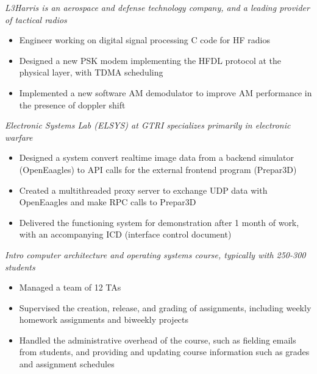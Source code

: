 
\begin{samepage}
\newline
\textit{L3Harris is an aerospace and defense technology company, and a leading provider of tactical radios}
\begin{itemize}[noitemsep,topsep=0pt,parsep=0pt,partopsep=0pt]
    \item Engineer working on digital signal processing C code for HF radios
    \item Designed a new PSK modem implementing the HFDL protocol at the physical layer, with TDMA scheduling
    \item Implemented a new software AM demodulator to improve AM performance in the presence of doppler shift
\end{itemize}
\end{samepage}
\smallskip

\begin{samepage}
\newline
\textit{Electronic Systems Lab (ELSYS) at GTRI specializes primarily in electronic warfare}
\begin{itemize}[noitemsep,topsep=0pt,parsep=0pt,partopsep=0pt]
    \item Designed a system convert realtime image data from a backend simulator (OpenEaagles) to API calls for the external frontend program (Prepar3D)
    \item Created a multithreaded proxy server to exchange UDP data with OpenEaagles and make RPC calls to Prepar3D
    \item Delivered the functioning system for demonstration after 1 month of work, with an accompanying ICD (interface control document)
\end{itemize}
\end{samepage}
\smallskip

\begin{samepage}
\newline
{}
\newline
\textit{Intro computer architecture and operating systems course, typically with 250-300 students}
\begin{itemize}[noitemsep,topsep=0pt,parsep=0pt,partopsep=0pt]
    \item Managed a team of 12 TAs
    \item Supervised the creation, release, and grading of assignments, including weekly homework assignments and biweekly projects
    \item Handled the administrative overhead of the course, such as fielding emails from students, and providing and updating course information such as grades and assignment schedules
\end{itemize}
\end{samepage}

